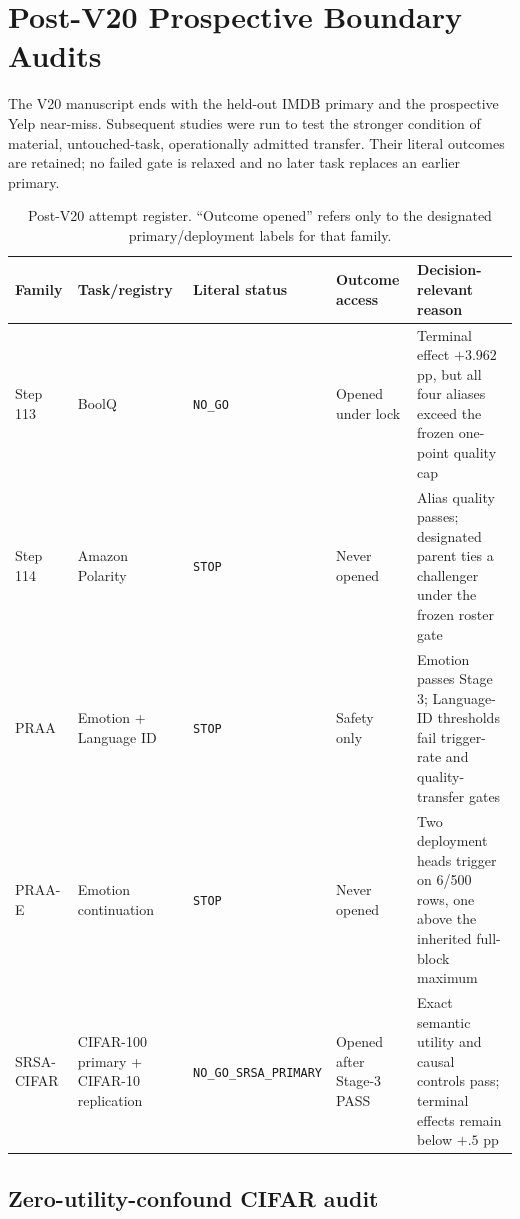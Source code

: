\section{Post-V20 Prospective Boundary Audits}
\label{app:v21-postv20}

The V20 manuscript ends with the held-out IMDB primary and the prospective Yelp near-miss. Subsequent studies were run to test the stronger condition of material, untouched-task, operationally admitted transfer. Their literal outcomes are retained; no failed gate is relaxed and no later task replaces an earlier primary.

\begin{table}[H]
\centering
\caption{Post-V20 attempt register. ``Outcome opened'' refers only to the designated primary/deployment labels for that family.}
\label{tab:v21-postv20-attempts}
\scriptsize
\setlength{\tabcolsep}{3pt}
\begin{tabularx}{\linewidth}{@{}p{.13\linewidth}p{.17\linewidth}p{.18\linewidth}p{.18\linewidth}>{\raggedright\arraybackslash}X@{}}
\toprule
Family & Task/registry & Literal status & Outcome access & Decision-relevant reason \\
\midrule
Step 113 & BoolQ & \texttt{NO\_GO} & Opened under lock & Terminal effect $+3.962$ pp, but all four aliases exceed the frozen one-point quality cap \\
Step 114 & Amazon Polarity & \texttt{STOP} & Never opened & Alias quality passes; designated parent ties a challenger under the frozen roster gate \\
PRAA & Emotion + Language ID & \texttt{STOP} & Safety only & Emotion passes Stage 3; Language-ID thresholds fail trigger-rate and quality-transfer gates \\
PRAA-E & Emotion continuation & \texttt{STOP} & Never opened & Two deployment heads trigger on 6/500 rows, one above the inherited full-block maximum \\
SRSA-CIFAR & CIFAR-100 primary + CIFAR-10 replication & \texttt{NO\_GO\_SRSA\_PRIMARY} & Opened after Stage-3 PASS & Exact semantic utility and causal controls pass; terminal effects remain below $+.5$ pp \\
\bottomrule
\end{tabularx}
\end{table}

\subsection{Zero-utility-confound CIFAR audit}

